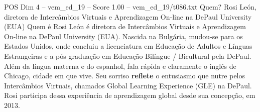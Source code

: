 \begin{textsample}{POS Dim 4 – vem\_ed\_19 – Score 1.00 – vem\_ed\_19/t086.txt}  \label{ex:f4_pos_114}
Quem?
Rosi León, diretora de Intercâmbios Virtuais e Aprendizagem On-line na DePaul University (EUA) Quem é Rosi León é diretora de Intercâmbios Virtuais e Aprendizagem On-line na DePaul University (EUA).
Nascida na Bulgária, mudou-se para os Estados Unidos, onde concluiu a licenciatura em Educação de Adultos e Línguas Estrangeiras e a pós-graduação em Educação Bilíngue / Bicultural pela DePaul.
Além da língua materna e do espanhol, fala rápida e claramente o inglês de Chicago, cidade em que vive.
Seu sorriso \textbf{reflete} o entusiasmo que nutre pelos Intercâmbios Virtuais, chamados Global Learning Experience (GLE) na DePaul.
Rosi participa dessa experiência de aprendizagem global desde sua concepção, em 2013.

\end{textsample}
